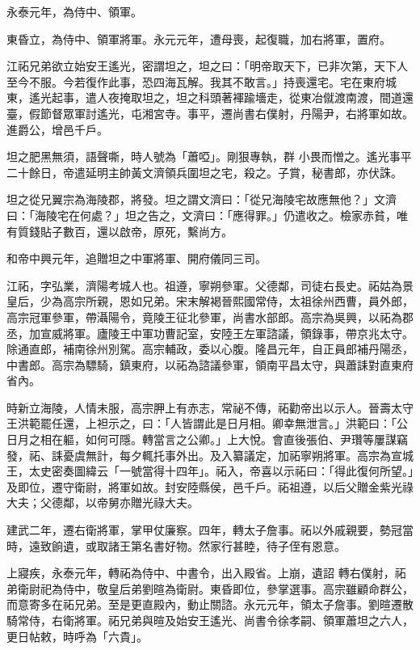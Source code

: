 \begin{pinyinscope}
 永泰元年，為侍中、領軍。



 東昏立，為侍中、領軍將軍。永元元年，遭母喪，起復職，加右將軍，置府。



 江祏兄弟欲立始安王遙光，密謂坦之，坦之曰：「明帝取天下，已非次第，天下人至今不服。今若復作此事，恐四海瓦解。我其不敢言。」持喪還宅。宅在東府城東，遙光起事，遣人夜掩取坦之，坦之科頭著褌踰墻走，從東冶僦渡南渡，間道還臺，假節督眾軍討遙光，屯湘宮寺。事平，遷尚書右僕射，丹陽尹，右將軍如故。進爵公，增邑千戶。



 坦之肥黑無須，語聲嘶，時人號為「蕭啞」。剛狠專執，群
 小畏而憎之。遙光事平二十餘日，帝遣延明主帥黃文濟領兵圍坦之宅，殺之。子賞，秘書郎，亦伏誅。



 坦之從兄翼宗為海陵郡，將發。坦之謂文濟曰：「從兄海陵宅故應無他？」文濟曰：「海陵宅在何處？」坦之告之，文濟曰：「應得罪。」仍遣收之。檢家赤貧，唯有質錢貼子數百，還以啟帝，原死，繫尚方。



 和帝中興元年，追贈坦之中軍將軍、開府儀同三司。



 江祏，字弘業，濟陽考城人也。祖遵，寧朔參軍。父德鄰，司徒右長史。祏姑為景皇后，少為高宗所親，恩如兄弟。宋末解褐晉熙國常侍，太祖徐州西曹，員外郎，高宗冠軍參軍，帶灄陽令，竟陵王征北參軍，尚書水部郎。高宗為吳興，以祏為郡丞，加宣威將軍。廬陵王中軍功曹記室，安陸王左軍諮議，領錄事，帶京兆太守。除通直郎，補南徐州別駕。高宗輔政，委以心腹。隆昌元年，自正員郎補丹陽丞，
 中書郎。高宗為驃騎，鎮東府，以祏為諮議參軍，領南平昌太守，與蕭誄對直東府省內。



 時新立海陵，人情未服，高宗胛上有赤志，常祕不傳，祏勸帝出以示人。晉壽太守王洪範罷任還，上袒示之，曰：「人皆謂此是日月相。卿幸無泄言。」洪範曰：「公日月之相在軀，如何可隱。轉當言之公卿。」上大悅。會直後張伯、尹瓚等屢謀竊發，祏、誄憂虞無計，每夕輒托事外出。及入纂議定，加祏寧朔將軍。高宗為宣城王，太史密奏圖緯云「一號當得十四年」。祏入，帝喜以示祏曰：「得此復何所望。」及即位，遷守衛尉，將軍如故。封安陸縣侯，邑千戶。祏祖遵，以后父贈金紫光祿大夫；父德鄰，以帝舅亦贈光祿大夫。



 建武二年，遷右衛將軍，掌甲仗廉察。四年，轉太子詹事。祏以外戚親要，勢冠當時，遠致餉遺，或取諸王第名書好物。然家行甚睦，待子侄有恩意。



 上寢疾，永泰元年，轉祏為侍中、中書令，出入殿省。上崩，遺詔
 轉右僕射，祏弟衛尉祀為侍中，敬皇后弟劉暄為衛尉。東昏即位，參掌選事。高宗雖顧命群公，而意寄多在祏兄弟。至是更直殿內，動止關諮。永元元年，領太子詹事。劉暄遷散騎常侍，右衛將軍。祏兄弟與暄及始安王遙光、尚書令徐孝嗣、領軍蕭坦之六人，更日帖敕，時呼為「六貴」。




\end{pinyinscope}
